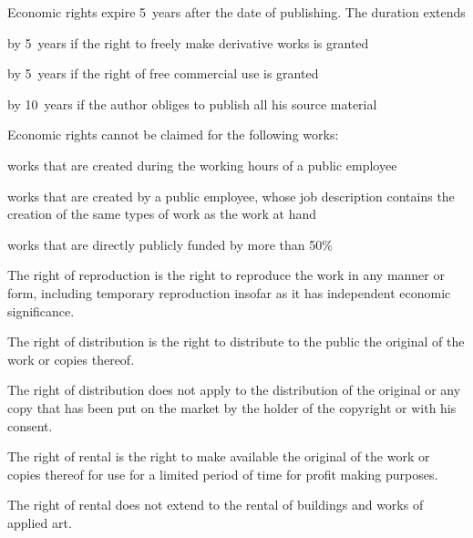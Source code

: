 \begin{contract}
\Sentence Economic rights expire 5~years after the date of publishing. The duration extends
\begin{legalenum}
	\item by 5~years if the right to  freely make derivative works is granted
	\item by 5~years if  the right of free commercial use is granted
	\item by 10~years if  the author obliges to publish all his source material
\end{legalenum}

\label{Par:WorksExcludedFromClaimingOfEconomicRights}
\Sentence Economic rights cannot be claimed for the following works:
\begin{legalenum}
	\item works that are created during the working hours of a public employee
	\item works that are created by a public employee, whose job description contains the creation of the same types of work as the work at hand
	\item works that are directly publicly funded by more than 50\%
\end{legalenum}

\label{Par:RightOfReproduction}
\Sentence The right of reproduction is the right to reproduce the work in any manner 
or form, including temporary reproduction insofar as it has independent 
economic significance.

\label{Par:RightOfDistribution}
\Sentence The right of distribution is the right to distribute to the public the original 
of the work or copies thereof.

\Sentence The right of distribution does not apply to the distribution of the original 
or any copy that has been put on the market by the holder of the copyright 
or with his consent.

\label{Par:RightOfRental}
\Sentence The right of rental is the right to make available the original of the work 
or copies thereof for use for a limited period of time for profit making 
purposes.

\Sentence The right of rental does not extend to the rental of buildings and works of 
applied art.


\end{contract}
